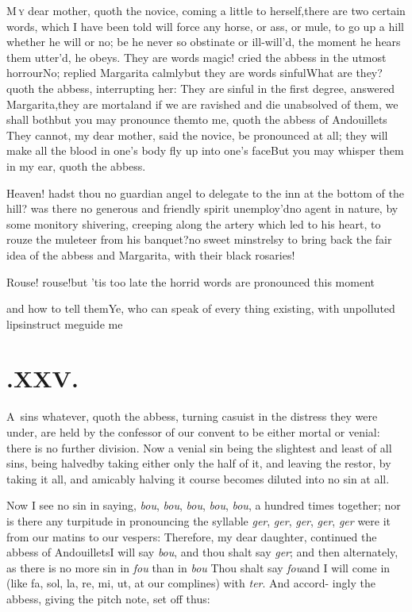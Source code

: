\documentclass{article}
\begin{document}
\lettrine{M}{\,y} dear mother, quoth the novice,
coming a little to herself,\tsh there are two certain words,
which I have been told will force any horse, or ass, or mule, to go
up a hill whether he will or no; be he never so obstinate or
ill-will’d, the moment he hears them utter’d, he obeys.
They are words magic! cried the abbess in the utmost
horrour\tsk No; replied Margarita calmly\tsk but they are
words sinful\tsk What are they? quoth the abbess, interrupting
her: They are sinful in the first degree, answered
Margarita,\break\tsk they are mortal\tsk and if we are
ravished and die unabsolved of them, we shall
both\tsh but you may pronounce them\pb to me, quoth the
abbess of Andouillets\break
\tsh They cannot, my dear
mother, said the novice, be pronounced at all; they will make all
the blood in one’s body fly up into one’s
face\tsk But you may whisper them in my ear, quoth the
abbess.

Heaven! hadst thou no guardian angel to delegate to the inn at
the bottom of the hill? was there no generous and friendly spirit
unemploy’d\tsh no agent in nature, by some monitory
shivering, creeping along the artery which led to his heart, to
rouze the muleteer from his banquet?\tsh no sweet
minstrelsy to bring back the fair idea of the abbess and
Margarita, with their black rosaries!

Rouse! rouse!\tsh but ’tis too late\tsk\break
the horrid words are pronounced this moment\tsh

\newpage
\tsh and how to tell them\tsk Ye, who can speak of
every thing existing, with unpolluted lips\tsk instruct
me\tsh guide me\tsh

\section{.\enspace XXV.}

\lettrine{A}{\,} sins whatever, quoth the abbess,
turning casuist in the distress they were under, are held by the
confessor of our convent to be either mortal or venial:\break
there is no further division. Now a venial sin being the
slightest and least of all sins,\break
\tsk being halved\tsk by taking either only the half of it, and
leaving the rest\tsk or, by taking it all, and amicably halving
it  course becomes
diluted into no sin at all.

\newpage
Now I see no sin in saying, \textit{bou}, \textit{bou}, \textit{bou}, \textit{bou},
\textit{bou}, a hundred times together; nor is there any turpitude in pronouncing
the syllable \textit{ger}, \textit{ger}, \textit{ger}, \textit{ger}, \textit{ger}
were it from our matins to our vespers: Therefore, my dear daughter, continued the
abbess of Andouillets\tsk I will say \textit{bou}, and thou shalt say \textit{ger};
and then alternately, as there is no more sin in \textit{fou}
than in \textit{bou}\tsk
Thou shalt say \textit{fou}\tsk and I will come in (like fa,
sol, la, re, mi, ut, at\break
our complines) with \textit{ter}. And accord-\break
ingly the abbess, giving the pitch note,
set off thus:
\end{document}
